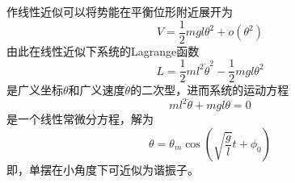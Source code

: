 \begin{example}[单摆]
作线性近似可以将势能在平衡位形附近展开为
\begin{equation*}
	V = \frac12 mgl\theta^2 + o(\theta^2)
\end{equation*}
由此在线性近似下系统的Lagrange函数
\begin{equation*}
	L = \frac12 ml^2 \dot{\theta}^2 - \frac12 mgl\theta^2 
\end{equation*}
是广义坐标$\theta$和广义速度$\dot{\theta}$的二次型，进而系统的运动方程
\begin{equation*}
	ml^2\ddot{\theta} + mgl\theta = 0
\end{equation*}
是一个线性常微分方程，解为
\begin{equation*}
	\theta = \theta_m \cos \left(\sqrt{\frac{g}{l}} t + \phi_0\right)
\end{equation*}
即，单摆在小角度下可近似为谐振子。
\end{example}

